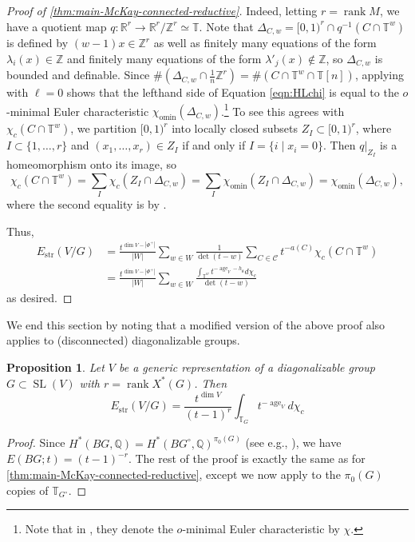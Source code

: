 \documentclass[12pt,a4paper]{amsart}
\newtheorem{proposition}[proposition]{Proposition}
\theoremstyle{definition}
\newcommand{\TT}{\mathbb T}
\newcommand{\ZZ}{\mathbb{Z}}
\newcommand{\QQ}{\mathbb{Q}}
\newcommand{\RR}{\mathbb{R}}
\newcommand{\cC}{\mathcal{C}}
\newcommand{\g}{\mathfrak{g}}
\newcommand{\str}{\mathrm{str}}
\renewcommand{\1}{\textbf{1}}
\newcommand{\<}{\langle}
\renewcommand{\>}{\rangle}
\DeclareMathOperator{\age}{age}
\DeclareMathOperator{\rank}{rank}
\DeclareMathOperator{\SL}{SL}
\DeclareMathOperator{\omin}{omin}
\begin{document}
\begin{proof}[{Proof of \autoref{thm:main-McKay-connected-reductive}}]
Indeed, letting $r=\rank M$, we have a quotient map $q\colon\RR^r\to\RR^r/\ZZ^r\simeq\TT$. Note that $\Delta_{C,w}=[0,1)^r\cap q^{-1}(C\cap\TT^w)$ is defined by $(w-1)x\in\ZZ^r$ as well as finitely many equations of the form $\lambda_i(x)\in\ZZ$ and finitely many equations of the form $\lambda'_j(x)\notin\ZZ$, so $\Delta_{C,w}$ is bounded and definable. Since $\#(\Delta_{C,w}\cap \frac{1}{n}\ZZ^r)=\#(C\cap\TT^w\cap\TT[n])$, applying \cite[Lemma 8.5.2]{HrushovskiLoeser2015} with $\ell=0$ shows that the lefthand side of Equation \eqref{eqn:HLchi} is equal to the $o$-minimal Euler characteristic $\chi_{\omin}(\Delta_{C,w})$.\footnote{Note that in \cite{HrushovskiLoeser2015}, they denote the $o$-minimal Euler characteristic by $\chi$.} To see this agrees with $\chi_c(C\cap\TT^w)$, we partition $[0,1)^r$ into locally closed subsets $Z_I\subset[0,1)^r$, where $I\subset\{1,\dots,r\}$ and $(x_1,\dots,x_r)\in Z_I$ if and only if $I=\{i\mid x_i=0\}$. Then $q|_{Z_I}$ is a homeomorphism onto its image, so 
\[
	\chi_c(C\cap\TT^w) = \sum_I \chi_c(Z_I\cap\Delta_{C,w}) = \sum_I \chi_{\omin}(Z_I\cap\Delta_{C,w})=\chi_{\omin}(\Delta_{C,w}),
\]
where the second equality is by \cite[Lemma 3.6]{Beke2011}.

Thus,
\begin{align*}
E_{\str}(V/G) &=\frac{t^{\dim V-|\Phi^+|}}{|W|}\sum_{w\in W}\frac{1}{\det(t-w)}\sum_{C\in\cC}t^{-a(C)}\chi_c(C\cap\TT^w)\\
&=\frac{t^{\dim V-|\Phi^+|}}{|W|}\sum_{w\in W}\frac{\int_{\TT^w}t^{-\age_V-h_\g}d\chi_c}{\det(t-w)}
\end{align*}
as desired.
\end{proof}


We end this section by noting that a modified version of the above proof also applies to (disconnected) diagonalizable groups.



\begin{proposition}\label{prop:mckay-diagonalizable}
Let $V$ be a generic representation of a diagonalizable group $G\subset\SL(V)$ with $r=\rank X^*(G)$. Then
\[
	E_{\str}(V/G)=\frac{t^{\dim V}}{(t-1)^r}\int_{\TT_G}t^{-\age_V} d\chi_c 
\]
\end{proposition}
\begin{proof}
Since $H^*(BG,\QQ)=H^*(BG^\circ,\QQ)^{\pi_0(G)}$ (see e.g., \cite[9.1.1]{DeligneHodgeIII}), we have $E(BG;t)=(t-1)^{-r}$. The rest of the proof is exactly the same as for \autoref{thm:main-McKay-connected-reductive}, except we now apply \cite[Lemma 8.5.2]{HrushovskiLoeser2015} to the $\pi_0(G)$ copies of $\TT_{G^\circ}$.
\end{proof}
\end{document}

